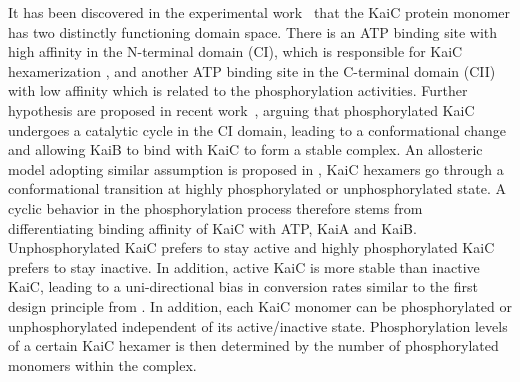 \documentclass[a4paper,10pt]{article}
\numberwithin{equation}{section}
\begin{document}
It has been discovered in the experimental work~\citet{hayashi2004} that the KaiC protein monomer has two distinctly functioning domain space. There is an ATP binding site with high affinity in the N-terminal domain (CI), which is responsible for KaiC hexamerization , and another ATP binding site in the C-terminal domain (CII) with low affinity which is related to the phosphorylation activities. Further hypothesis are proposed in recent work~\citet{phong2012}, arguing that phosphorylated KaiC undergoes a catalytic cycle in the CI domain, leading to a conformational change and allowing KaiB to bind with KaiC to form a stable complex. An allosteric model adopting similar assumption is proposed in \citet{van2007}, KaiC hexamers go through a conformational transition at highly phosphorylated or unphosphorylated state. A cyclic behavior in the phosphorylation process therefore stems from differentiating binding affinity of KaiC with ATP, KaiA and KaiB. Unphosphorylated KaiC prefers to stay active and highly phosphorylated KaiC prefers to stay inactive. In addition, active KaiC is more stable than inactive KaiC, leading to a uni-directional bias in conversion rates similar to the first design principle from \citet{jolley2012}. In addition, each KaiC monomer can be phosphorylated or unphosphorylated independent of its active/inactive state. Phosphorylation levels of a certain KaiC hexamer is then determined by the number of phosphorylated monomers within the complex\citet{van2007}. 

                                                    
\end{document}
